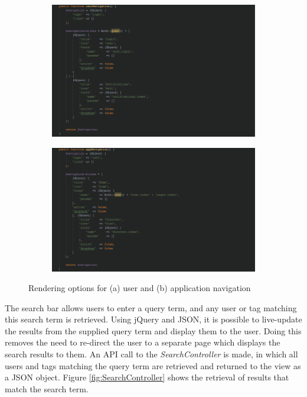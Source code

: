 \begin{figure}[H]
\centering
\begin{subfigure}[b]{1\linewidth}
	\includegraphics[width=1\textwidth]{Images/Implementation/UserNavigation}
	\caption{}
	\label{fig:UserNavigation}
\end{subfigure}
\begin{subfigure}[b]{1\linewidth}
	\includegraphics[width=1\textwidth]{Images/Implementation/AppNavigation}
	\caption{}
	\label{fig:AppNavigation}
\end{subfigure}
\caption{Rendering options for (a) user and (b) application navigation}
\label{fig:LayoutComposerNav}
\end{figure}

\noindent The search bar allows users to enter a query term, and any user or tag matching this search term is retrieved. Using jQuery and JSON, it is possible to live-update the results from the supplied query term and display them to the user. Doing this removes the need to re-direct the user to a separate page which displays the search results to them. An API call to the \textit{SearchController} is made, in which all users and tags matching the query term are retrieved and returned to the view as a JSON object. Figure \ref{fig:SearchController} shows the retrieval of results that match the search term.

